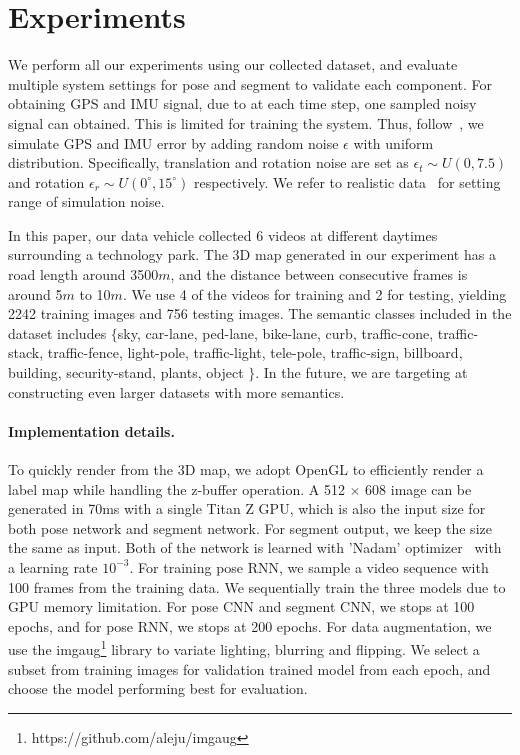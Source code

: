 \documentclass[10pt,twocolumn,letterpaper]{article}
\begin{document}
\section{Experiments}
\label{sec:experiments}
We perform all our experiments using our collected dataset, and evaluate multiple system settings for pose and segment to validate each component. 
For obtaining GPS and IMU signal, due to at each time step, one sampled noisy signal can obtained. This is limited for training the system. Thus, follow~\cite{vishal2015accurate}, we simulate GPS and IMU error by adding random noise $\epsilon$ with uniform distribution. Specifically, translation and rotation noise are set as $\epsilon_t \sim U(0, 7.5)$ and rotation $\epsilon_r \sim U(0^{\circ}, 15^{\circ})$ respectively. We refer to realistic data~\cite{lee2015gps} for setting range of simulation noise.

In this paper, our data vehicle collected 6 videos at different daytimes surrounding a technology park. The 3D map generated in our experiment has a road length around 3500$m$, and the distance between consecutive frames is around 5$m$ to 10$m$. We use 4 of the videos for training and 2 for testing, yielding 2242 training images and 756 testing images. The semantic classes included in the dataset includes $\{$sky, car-lane, ped-lane, bike-lane, curb, traffic-cone, traffic-stack, traffic-fence, light-pole, traffic-light, tele-pole, traffic-sign, billboard, building, security-stand, plants, object $\}$. In the future, we are targeting at constructing even larger datasets with more semantics.

\paragraph{Implementation details.} To quickly render from the 3D map, we adopt OpenGL to efficiently render a label map while handling the z-buffer operation. A 512 $\times$ 608 image can be generated in 70ms with a single Titan Z GPU, which is also the input size for both pose network and segment network. For segment output, we keep the size the same as input. Both of the network is learned with 'Nadam' optimizer~\cite{dozat2016incorporating} with a learning rate $10^{-3}$. For training pose RNN, we sample a video sequence with 100 frames from the training data. We sequentially train the three models due to GPU memory limitation.
For pose CNN and segment CNN, we stops at 100 epochs, and for pose RNN, we stops at 200 epochs. For data augmentation, we use the imgaug\footnote{https://github.com/aleju/imgaug} library to variate lighting, blurring and flipping. We select a subset from training images for validation trained model from each epoch, and choose the model performing best for evaluation.
\end{document}
